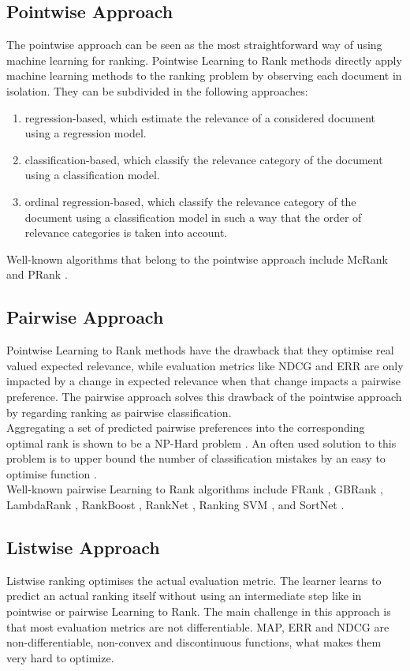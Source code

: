 \subsection{Pointwise Approach}
The pointwise approach can be seen as the most straightforward way of using machine learning for ranking. Pointwise Learning to Rank methods directly apply machine learning methods to the ranking problem by observing each document in isolation. They can be subdivided in the following approaches:
	\begin{enumerate}
	\item regression-based, which estimate the relevance of a considered document using a regression model.
	\item classification-based, which classify the relevance category of the document using a classification model.
	\item ordinal regression-based, which classify the relevance category of the document using a classification model in such a way that the order of relevance categories is taken into account. 
	\end{enumerate}
Well-known algorithms that belong to the pointwise approach include McRank \cite{Li2007} and PRank \cite{Crammer2001}.
\subsection{Pairwise Approach}
Pointwise Learning to Rank methods have the drawback that they optimise real valued expected relevance, while evaluation metrics like \ac{NDCG} and \ac{ERR} are only impacted by a change in expected relevance when that change impacts a pairwise preference. The pairwise approach solves this drawback of the pointwise approach by regarding ranking as pairwise classification.\\

Aggregating a set of predicted pairwise preferences into the corresponding optimal rank is shown to be a NP-Hard problem \cite{Feldman2012}. An often used solution to this problem is to upper bound the number of classification mistakes by an easy to optimise function \cite{Bartlett2006}.\\

Well-known pairwise Learning to Rank algorithms include FRank \cite{Tsai2007}, GBRank \cite{Zheng2007}, LambdaRank \cite{Burges2006}, RankBoost \cite{Freund2003}, RankNet \cite{Burges2005}, Ranking \acs{SVM} \cite{Herbrich1999b,Joachims2002}, and SortNet \cite{Rigutini2008}.
\subsection{Listwise Approach}
Listwise ranking optimises the actual evaluation metric. The learner learns to predict an actual ranking itself without using an intermediate step like in pointwise or pairwise Learning to Rank. The main challenge in this approach is that most evaluation metrics are not differentiable. \ac{MAP}, \ac{ERR} and \ac{NDCG} are non-differentiable, non-convex and discontinuous functions, what makes them very hard to optimize.\\

